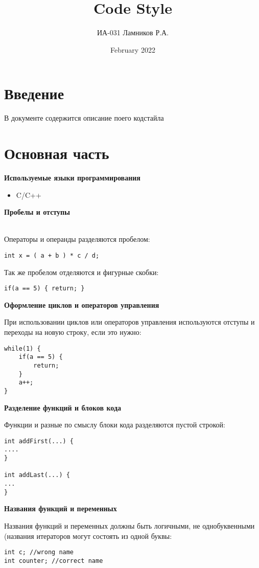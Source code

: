 \documentclass[12pt]{article}
\title{Code Style}
\author{ИА-031 Ламников Р.А.}
\date{February 2022}
\begin{document}
\lstset{language=C, 
numbers=left,
basicstyle=\small\sffamily}

\maketitle

\section{Введение}
В документе содержится описание поего кодстайла

\section{Основная часть}
\textbf{Используемые языки программирования}
\begin{itemize}
    \item C/C++
\end{itemize}
\textbf{Пробелы и отступы}

\\Операторы и операнды разделяются пробелом:

\begin{lstlisting}
int x = ( a + b ) * c / d;
\end{lstlisting}

Так же пробелом отделяются и фигурные скобки:

\begin{lstlisting}
if(a == 5) { return; }
\end{lstlisting}
\textbf{Оформление циклов и операторов управления}

При использовании циклов или операторов управления используются отступы и переходы на новую строку, если это нужно:

\begin{lstlisting}
while(1) { 
    if(a == 5) {
        return;
    }
    a++;
}
\end{lstlisting}
\textbf{Разделение функций и блоков кода}

Функции и разные по смыслу блоки кода разделяются пустой строкой:
\begin{lstlisting}
int addFirst(...) {
....
}

int addLast(...) {
...
}
\end{lstlisting}
\textbf{Названия функций и переменных}

Названия функций и переменных должны быть логичными, не однобуквенными (названия итераторов могут состоять из одной буквы:
\begin{lstlisting}
int c; //wrong name
int counter; //correct name
\end{lstlisting}
\end{document}
